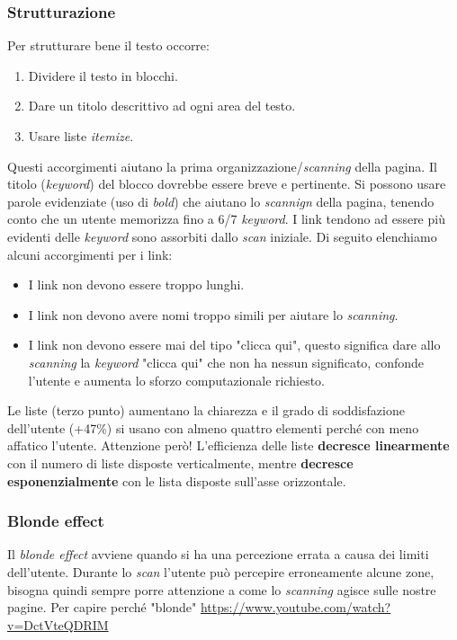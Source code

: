 			\subsubsection{Strutturazione}
				Per strutturare bene il testo occorre:
				\begin{enumerate}
					\item Dividere il testo in blocchi.
					\item Dare un titolo descrittivo ad ogni area del testo.
					\item Usare liste \emph{itemize}.
				\end{enumerate}
				Questi accorgimenti aiutano la prima organizzazione/\emph{scanning} della pagina. Il titolo (\emph{keyword}) del blocco dovrebbe essere breve e pertinente. Si possono usare parole evidenziate (uso di \emph{bold}) che aiutano lo \emph{scannign} della pagina, tenendo conto che un utente memorizza fino a 6/7 \emph{keyword}.
				I link tendono ad essere più evidenti delle \emph{keyword} sono assorbiti dallo \emph{scan} iniziale. Di seguito elenchiamo alcuni accorgimenti per i link:
				\begin{itemize}
					\item I link non devono essere troppo lunghi.
					\item I link non devono avere nomi troppo simili per aiutare lo \emph{scanning}.
					\item I link non devono essere mai del tipo "clicca qui", questo significa dare allo \emph{scanning} la \emph{keyword} "clicca qui" che non ha nessun significato, confonde l'utente e aumenta lo sforzo computazionale richiesto.
				\end{itemize}
				Le liste (terzo punto) aumentano la chiarezza e il grado di soddisfazione dell'utente (+47\%) si usano con almeno quattro elementi perché con meno affatico l'utente. Attenzione però! L'efficienza delle liste \textbf{decresce linearmente} con il numero di liste disposte verticalmente, mentre \textbf{decresce esponenzialmente} con le lista disposte sull'asse orizzontale.
				
			\subsubsection{Blonde effect}
				Il \emph{blonde effect} avviene quando si ha una percezione errata a causa dei limiti dell'utente. Durante lo \emph{scan} l'utente può percepire erroneamente alcune zone, bisogna quindi sempre porre attenzione a come lo \emph{scanning} agisce sulle nostre pagine.
			Per capire perché "blonde" \url{https://www.youtube.com/watch?v=DctVteQDRIM}